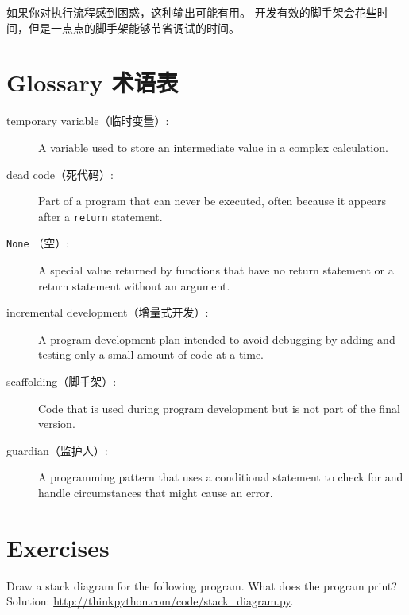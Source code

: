 \documentclass[10pt]{book}
\begin{document}
\begin{CJK}{UTF8}{gbsn}
如果你对执行流程感到困惑，这种输出可能有用。
开发有效的脚手架会花些时间，但是一点点的脚手架能够节省调试的时间。

\section{Glossary 术语表}

\begin{description}

\item[temporary variable（临时变量）:]  A variable used to store an intermediate value in
a complex calculation.

\item[dead code（死代码）:]  Part of a program that can never be executed, often because
it appears after a {\tt return} statement.

\item[{\tt None} （空）:]  A special value returned by functions that
have no return statement or a return statement without an argument.

\item[incremental development（增量式开发）:]  A program development plan intended to
avoid debugging by adding and testing only
a small amount of code at a time.

\item[scaffolding（脚手架）:]  Code that is used during program development but is
not part of the final version.

\item[guardian（监护人）:]  A programming pattern that uses a conditional
statement to check for and handle circumstances that
might cause an error.

\end{description}


\section{Exercises}

\begin{exercise}

Draw a stack diagram for the following program.  What does the program print?
Solution: \url{http://thinkpython.com/code/stack_diagram.py}.


\end{exercise}
\end{CJK}
\end{document}
